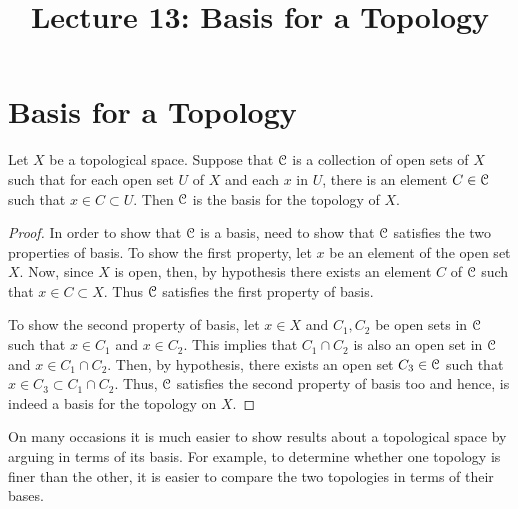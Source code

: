 \documentclass[a4paper,english,12pt]{article}
\begin{document}
\title{Lecture 13: Basis for a Topology}
\author{}
\maketitle


\section{Basis for a Topology}

\begin{lem} \label{basis_alternate_defn_2}
 Let $X$ be a topological space. Suppose that $\mathcal{C}$ is a collection of open sets of $X$ such that for each open set $U$ of $X$
 and each $x$ in $U$, there is an element $C \in \mathcal{C}$ such that $x \in  C \subset U$. Then $\mathcal{C}$ is the basis for the topology of $X$.
\end{lem}
\begin{proof}
In order to show that $\mathcal{C}$ is a basis, need to show that $\mathcal{C}$ satisfies the two properties of basis. To show the first property, let $x$ be an element of the open 
set $X$. Now, since $X$ is open, then, by hypothesis there exists an element $C$ of $\mathcal{C}$ such that $x \in C \subset X$. Thus $\mathcal{C}$ satisfies the first property of 
basis. 

To show the second property of basis, let $x \in X$ and $C_{1}, C_{2}$ be open sets in $\mathcal{C}$ such that $x \in C_{1}$ and $x \in C_{2}$. This implies that 
$C_{1} \cap C_{2}$ is also an open set in $\mathcal{C}$ and $x \in C_{1} \cap C_{2}$. Then, by hypothesis, there exists an open set $C_{3} \in \mathcal{C}$ such that
$x \in C_{3} \subset C_{1} \cap C_{2}$. Thus, $\mathcal{C}$ satisfies the second property of basis too and hence, is indeed a basis for the topology on $X$.
\end{proof}

On many occasions it is much easier to show results about a topological space by arguing in terms of its basis. For example, to determine whether one 
topology is finer than the other, it is easier to compare the two topologies in terms of their bases.
\end{document}
